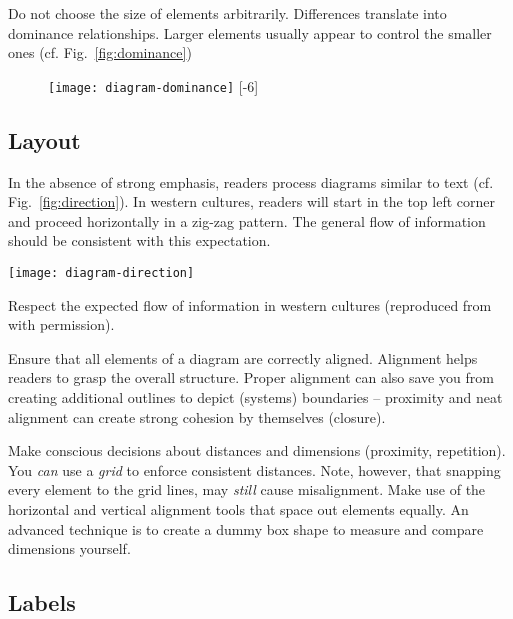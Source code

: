 Do not choose the size of elements arbitrarily. Differences translate into dominance relationships. Larger elements usually appear to control the smaller ones (cf. Fig.~\ref{fig:dominance})

\begin{figure}[t]
\centering
\texttt{[image: diagram-dominance]}
[-6\baselineskip]
\end{figure}


\subsection{Layout}

In the absence of strong emphasis, readers process diagrams similar to text (cf. Fig.~\ref{fig:direction}). In western cultures, readers will start in the top left corner and proceed horizontally in a zig-zag pattern. The general flow of information should be consistent with this expectation.

\begin{marginfigure}
\centering
\texttt{[image: diagram-direction]}
\caption{\label{fig:direction} Respect the expected flow of information in western cultures (reproduced from \cite{Carter12} with permission).}%
\end{marginfigure}


Ensure that all elements of a diagram are correctly aligned. Alignment helps readers to grasp the overall structure. Proper alignment can also save you from creating additional outlines to depict (systems) boundaries – proximity and neat alignment can create strong cohesion by themselves (closure).

Make conscious decisions about distances and dimensions (proximity, repetition). You \emph{can} use a \emph{grid} to enforce consistent distances. Note, however, that snapping every element to the grid lines, may \emph{still} cause misalignment. Make use of the horizontal and vertical alignment tools that space out elements equally. An advanced technique is to create a dummy box shape to measure and compare dimensions yourself.

\subsection{Labels}

